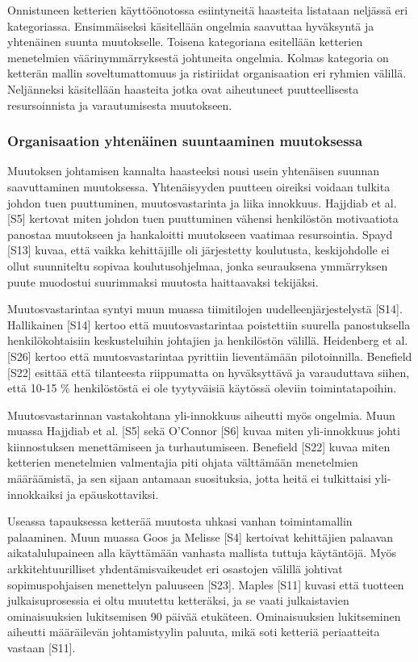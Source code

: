 Onnistuneen ketterien käyttöönotossa esiintyneitä haasteita listataan neljässä
eri kategoriassa. Ensimmäiseksi käsitellään ongelmia saavuttaa hyväksyntä ja
yhtenäinen suunta muutokselle. Toisena kategoriana esitellään ketterien
menetelmien väärinymmärryksestä johtuneita ongelmia. Kolmas kategoria on
ketterän mallin soveltumattomuus ja ristiriidat organisaation eri ryhmien
välillä. Neljänneksi käsitellään haasteita jotka ovat aiheutuneet
puutteellisesta resursoinnista ja varautumisesta muutokseen.

\subsubsection{Organisaation yhtenäinen suuntaaminen muutoksessa}

Muutoksen johtamisen kannalta haasteeksi nousi usein yhtenäisen suunnan
saavuttaminen muutoksessa. Yhtenäisyyden puutteen oireiksi voidaan tulkita
johdon tuen puuttuminen, muutosvastarinta ja liika innokkuus. Hajjdiab et al.
[S5] kertovat miten johdon tuen puuttuminen vähensi henkilöstön motivaatiota
panostaa muutokseen ja hankaloitti muutokseen vaatimaa resursointia. Spayd [S13]
kuvaa, että vaikka kehittäjille oli järjestetty koulutusta, keskijohdolle ei
ollut suunniteltu sopivaa koulutusohjelmaa, jonka seurauksena ymmärryksen
puute muodostui suurimmaksi muutosta haittaavaksi tekijäksi.

Muutosvastarintaa syntyi muun muassa tiimitilojen uudelleenjärjestelystä [S14].
Hallikainen [S14] kertoo että muutosvastarintaa poistettiin suurella
panostuksella henkilökohtaisiin keskusteluihin johtajien ja henkilöstön välillä.
Heidenberg et al. [S26] kertoo että muutosvastarintaa pyrittiin lieventämään
pilotoinnilla. Benefield [S22] esittää että tilanteesta riippumatta on
hyväksyttävä ja varauduttava siihen, että 10-15 \% henkilöstöstä ei ole
tyytyväisiä käytössä oleviin toimintatapoihin.

Muutosvastarinnan vastakohtana yli-innokkuus aiheutti myös ongelmia. Muun muassa
Hajjdiab et al. [S5] sekä O'Connor [S6] kuvaa miten yli-innokkuus johti 
kiinnostuksen menettämiseen ja turhautumiseen. Benefield [S22] kuvaa miten
ketterien menetelmien valmentajia piti ohjata välttämään menetelmien
määräämistä, ja sen sijaan antamaan suosituksia, jotta heitä ei tulkittaisi
yli-innokkaiksi ja epäuskottaviksi.

Useassa tapauksessa ketterää muutosta uhkasi vanhan toimintamallin palaaminen.
Muun muassa Goos ja Melisse [S4] kertoivat kehittäjien palaavan
aikatalulupaineen alla käyttämään vanhasta mallista tuttuja käytäntöjä. Myös
arkkitehtuurilliset yhdentämisvaikeudet eri osastojen välillä johtivat
sopimuspohjaisen menettelyn paluuseen [S23]. Maples [S11] kuvasi että tuotteen
julkaisuprosessia ei oltu muutettu ketteräksi, ja se vaati julkaistavien
ominaisuuksien lukitsemisen 90 päivää etukäteen. Ominaisuuksien lukitseminen
aiheutti määräilevän johtamistyylin paluuta, mikä soti ketteriä periaatteita
vastaan [S11].

